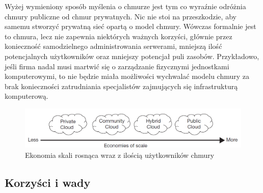 \documentclass[12pt,a4paper,twoside,titlepage,openright]{book}
\begin{document}
Wyżej wymieniony sposób myślenia o chmurze jest tym co wyraźnie odróżnia chmury publiczne od chmur prywatnych. Nic nie stoi na przeszkodzie, aby samemu stworzyć prywatną sieć opartą o model chmury. Wówczas formalnie jest to chmura, lecz nie zapewnia niektórych ważnych korzyści, głównie przez konieczność samodzielnego administrowania serwerami, mniejszą ilość potencjalnych użytkowników oraz mniejszy potencjał puli zasobów. Przykładowo, jeśli firma nadal musi martwić się o zarządzanie fizycznymi jednostkami komputerowymi, to nie będzie miała możliwości wychwalać modelu chmury za brak konieczności zatrudniania specjalistów zajmujących się infrastrukturą komputerową.

\begin{figure}[h]
	\centering
			\includegraphics[width=\textwidth]{ekonomia-skali.png}
		\caption{Ekonomia skali rosnąca wraz z ilością użytkowników chmury \cite{ccCambridge}}
		\label{fig:ekonomia-skali}
\end{figure}

\subsection*{Korzyści i wady}
\end{document}
